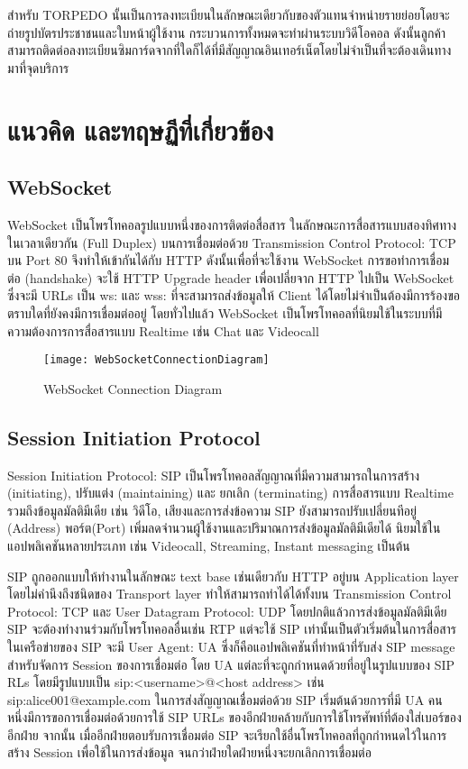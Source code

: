 สำหรับ TORPEDO นั้นเป็นการลงทะเบียนในลักษณะเดียวกับของตัวแทนจำหน่ายรายย่อยโดยจะถ่ายรูปบัตรประชาชนและใบหน้าผู้ใช้งาน กระบวนการทั้งหมดจะทำผ่านระบบวิดีโอคอล ดังนั้นลูกค้าสามารถติดต่อลงทะเบียนซิมการ์ดจากที่ใดก็ได้ที่มีสัญญาณอินเทอร์เน็ตโดยไม่จำเป็นที่จะต้องเดินทางมาที่จุดบริการ

\section{แนวคิด และทฤษฏีที่เกี่ยวข้อง}

\subsection{WebSocket}
WebSocket เป็นโพรโทคอลรูปแบบหนึ่งของการติดต่อสื่อสาร ในลักษณะการสื่อสารแบบสองทิศทางในเวลาเดียวกัน (Full Duplex) บนการเชื่อมต่อด้วย Transmission Control Protocol: TCP บน Port 80 จึงทำให้เข้ากันได้กับ HTTP ดังนั้นเพื่อที่จะใช้งาน WebSocket การขอทำการเชื่อมต่อ (handshake) จะใช้ HTTP Upgrade header เพื่อเปลี่ยจาก HTTP ไปเป็น WebSocket ซึ่งจะมี URLs เป็น ws: และ wss: ที่จะสามารถส่งข้อมูลให้ Client ได้โดยไม่จำเป็นต้องมีการร้องขอตราบใดที่ยังคงมีการเชื่อมต่ออยู่ โดยทั่วไปแล้ว WebSocket เป็นโพรโทคอลที่นิยมใช้ในระบบที่มีความต้องการการสื่อสารแบบ Realtime เช่น Chat และ Videocall

\begin{figure}[h]
	\centering
	\texttt{[image: WebSocketConnectionDiagram]}
	\caption{WebSocket Connection Diagram}
\end{figure}

\subsection{Session Initiation Protocol}
Session Initiation Protocol: SIP เป็นโพรโทคอลสัญญาณที่มีความสามารถในการสร้าง (initiating), ปรับแต่ง (maintaining) และ ยกเลิก (terminating) การสื่อสารแบบ Realtime รวมถึงข้อมูลมัลติมีเดีย เช่น วิดีโอ, เสียงและการส่งข้อความ SIP ยังสามารถปรับเปลี่ยนทีอยู่ (Address) พอร์ต(Port) เพิ่มลดจำนวนผู้ใช้งานและปริมาณการส่งข้อมูลมัลติมีเดียได้ นิยมใช้ในแอปพลิเคชันหลายประเภท เช่น Videocall, Streaming, Instant messaging เป็นต้น

SIP ถูกออกแบบให้ทำงานในลักษณะ text base เช่นเดียวกับ HTTP อยู่บน Application layer โดยไม่คำนึงถึงชนิดของ Transport layer ทำให้สามารถทำได้ได้ทั้งบน Transmission Control Protocol: TCP และ  User Datagram Protocol: UDP โดยปกติแล้วการส่งข้อมูลมัลติมีเดีย SIP จะต้องทำงานร่วมกับโพรโทคอลอื่นเช่น RTP แต่จะใช้ SIP เท่านั้นเป็นตัวเริ่มต้นในการสื่อสาร ในเครือข่ายของ SIP จะมี User Agent: UA ซึ่งก็คือแอปพลิเคชันที่ทำหน้าที่รับส่ง SIP message สำหรับจัดการ Session ของการเชื่อมต่อ โดย UA แต่ละที่จะถูกกำหนดด้วยที่อยู่ในรูปแบบของ SIP RLs โดยมีรูปแบบเป็น sip:<username>@<host address>  เช่น sip:alice001@example.com
ในการส่งสัญญาณเชื่อมต่อด้วย SIP เริ่มต้นด้วยการที่มี UA คนหนึ่งมีการขอการเชื่อมต่อด้วยการใช้ SIP URLs ของอีกฝ่ายคล้ายกับการใช้โทรศัพท์ที่ต้องใส่เบอร์ของอีกฝ่าย จากนั้น เมื่ออีกฝ่ายตอบรับการเชื่อมต่อ  SIP จะเรียกใช้อื่นโพรโทคอลที่ถูกกำหนดไว้ในการสร้าง Session เพื่อใช้ในการส่งข้อมูล จนกว่าฝ่ายใดฝ่ายหนึ่งจะยกเลิกการเชื่อมต่อ


